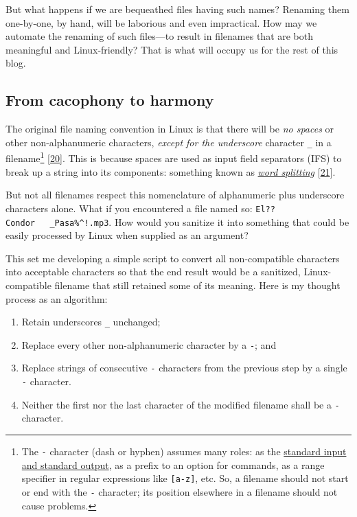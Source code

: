 \documentclass[
  a4paper,
]{article}
\providecommand{\tightlist}{%
  \setlength{\itemsep}{0pt}\setlength{\parskip}{0pt}}
\begin{document}
But what happens if we are bequeathed files having such names? Renaming
them one-by-one, by hand, will be laborious and even impractical. How
may we automate the renaming of such files---to result in filenames that
are both meaningful and Linux-friendly? That is what will occupy us for
the rest of this blog.

\hypertarget{from-cacophony-to-harmony}{%
\subsection{From cacophony to harmony}\label{from-cacophony-to-harmony}}

The original file naming convention in Linux is that there will be
\emph{no spaces} or other non-alphanumeric characters, \emph{except for
the underscore} character \texttt{\_} in a filename\footnote{The
  \texttt{-} character (dash or hyphen) assumes many roles: as the
  \href{https://en.wikipedia.org/wiki/Standard_streams}{standard input
  and standard output}, as a prefix to an option for commands, as a
  range specifier in regular expressions like \texttt{{[}a-z{]}}, etc.
  So, a filename should not start or end with the \texttt{-} character;
  its position elsewhere in a filename should not cause problems.}
{[}\protect\hyperlink{ref-unix}{20}{]}. This is because spaces are used
as input field separators (IFS) to break up a string into its
components: something known as
\href{https://mywiki.wooledge.org/WordSplitting?highlight=\%28spaces\%29\%7C\%28word\%29\%7C\%28splitting\%29}{\emph{word
splitting}} {[}\protect\hyperlink{ref-wordsplitting}{21}{]}.

But not all filenames respect this nomenclature of alphanumeric plus
underscore characters alone. What if you encountered a file named so:
\texttt{El??Condor\ \ \ \_Pasa\%\^{}!.mp3}. How would you sanitize it
into something that could be easily processed by Linux when supplied as
an argument?

This set me developing a simple script to convert all non-compatible
characters into acceptable characters so that the end result would be a
sanitized, Linux-compatible filename that still retained some of its
meaning. Here is my thought process as an algorithm:

\begin{enumerate}
\tightlist
\item
  Retain underscores \texttt{\_} unchanged;
\item
  Replace every other non-alphanumeric character by a \texttt{-}; and
\item
  Replace strings of consecutive \texttt{-} characters from the previous
  step by a single \texttt{-} character.
\item
  Neither the first nor the last character of the modified filename
  shall be a \texttt{-} character.
\end{enumerate}
\end{document}
